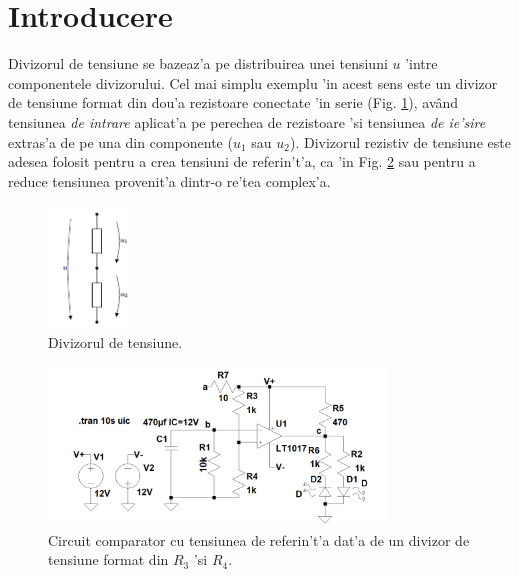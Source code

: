 \section{Introducere}

\begin{summary}
  Divizorul de tensiune se bazeaz'a pe distribuirea unei tensiuni $u$ 'intre componentele divizorului. Cel mai simplu exemplu 'in acest sens este un divizor de tensiune format din dou'a rezistoare conectate 'in serie (Fig. \ref{fig:divizor_schema_exemplu}), av\^and tensiunea \textit{de intrare} aplicat'a pe perechea de rezistoare 'si tensiunea \textit{de ie'sire} extras'a de pe una din componente ($u_1$ sau $u_2$). Divizorul rezistiv de tensiune este adesea folosit pentru a crea tensiuni de referin't'a, ca 'in Fig. \ref{fig:comparator_cu_divizor} sau pentru a reduce tensiunea provenit'a dintr-o re'tea complex'a.
\end{summary}

\begin{figure}[!b]
	\centering
		\includegraphics[width=0.19\textwidth]{laborator_01/figuri/divizor_schema_exemplu}
	\caption{Divizorul de tensiune.}
	\label{fig:divizor_schema_exemplu}
\end{figure}

\begin{figure}
	\centering
		\includegraphics[width=0.8\textwidth]{laborator_01/figuri/comparator_cu_divizor}
	\caption{Circuit comparator cu tensiunea de referin't'a dat'a de un divizor de tensiune format din $R_3$ 'si $R_4$.}
	\label{fig:comparator_cu_divizor}
\end{figure}


